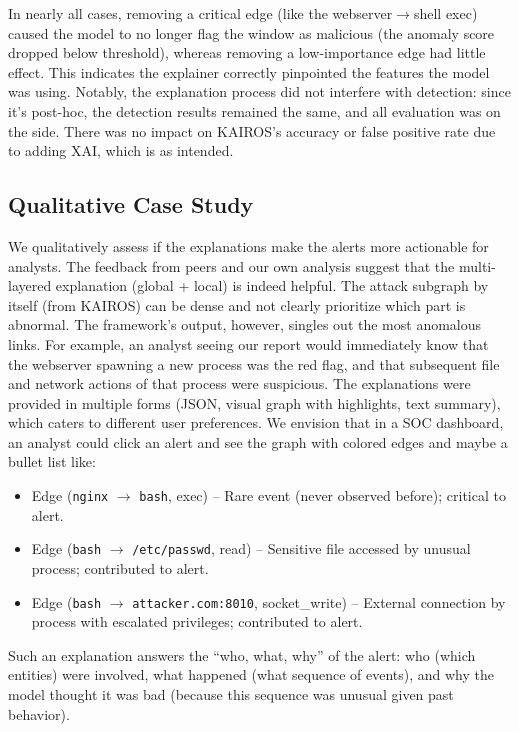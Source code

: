 \documentclass[conference]{IEEEtran}
\begin{document}
In nearly all cases, removing a critical edge (like the webserver$\rightarrow$shell exec) caused the model to no longer flag the window as malicious (the anomaly score dropped below threshold), whereas removing a low-importance edge had little effect. This indicates the explainer correctly pinpointed the features the model was using. Notably, the explanation process did not interfere with detection: since it's post-hoc, the detection results remained the same, and all evaluation was on the side. There was no impact on KAIROS's accuracy or false positive rate due to adding XAI, which is as intended.

\subsection{Qualitative Case Study}
We qualitatively assess if the explanations make the alerts more actionable for analysts. The feedback from peers and our own analysis suggest that the multi-layered explanation (global + local) is indeed helpful. The attack subgraph by itself (from KAIROS) can be dense and not clearly prioritize which part is abnormal. The framework's output, however, singles out the most anomalous links. For example, an analyst seeing our report would immediately know that the webserver spawning a new process was the red flag, and that subsequent file and network actions of that process were suspicious. The explanations were provided in multiple forms (JSON, visual graph with highlights, text summary), which caters to different user preferences. We envision that in a SOC dashboard, an analyst could click an alert and see the graph with colored edges and maybe a bullet list like:
\begin{itemize}
    \item Edge (\texttt{nginx} $\rightarrow$ \texttt{bash}, exec) -- Rare event (never observed before); critical to alert.
    \item Edge (\texttt{bash} $\rightarrow$ \texttt{/etc/passwd}, read) -- Sensitive file accessed by unusual process; contributed to alert.
    \item Edge (\texttt{bash} $\rightarrow$ \texttt{attacker.com:8010}, socket\_write) -- External connection by process with escalated privileges; contributed to alert.
\end{itemize}

Such an explanation answers the ``who, what, why'' of the alert: who (which entities) were involved, what happened (what sequence of events), and why the model thought it was bad (because this sequence was unusual given past behavior).
\end{document}
